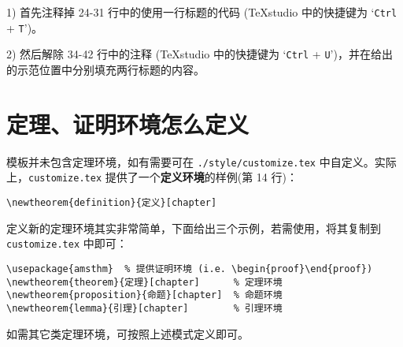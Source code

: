 1) 首先注释掉 24-31 行中的使用一行标题的代码 (TeXstudio 中的快捷键为 `\texttt{Ctrl} + \texttt{T}')。

2) 然后解除 34-42 行中的注释 (TeXstudio 中的快捷键为 `\texttt{Ctrl} + \texttt{U}')，并在给出的示范位置中分别填充两行标题的内容。

\section{定理、证明环境怎么定义}

模板并未包含定理环境，如有需要可在 \texttt{./style/customize.tex} 中自定义。实际上，\texttt{customize.tex} 提供了一个\textbf{定义环境}的样例(第 14 行)：
\begin{verbatim}
\newtheorem{definition}{定义}[chapter]
\end{verbatim}

定义新的定理环境其实非常简单，下面给出三个示例，若需使用，将其复制到 \texttt{customize.tex} 中即可：

\begin{verbatim}
\usepackage{amsthm}  % 提供证明环境 (i.e. \begin{proof}\end{proof})
\newtheorem{theorem}{定理}[chapter]      % 定理环境
\newtheorem{proposition}{命题}[chapter]  % 命题环境
\newtheorem{lemma}{引理}[chapter]        % 引理环境
\end{verbatim}

如需其它类定理环境，可按照上述模式定义即可。
